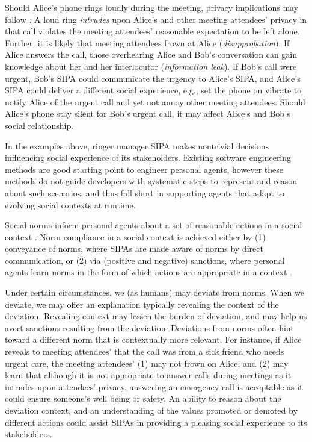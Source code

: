 Should Alice's phone rings loudly during the meeting, privacy
implications may follow
\citep{Murukannaiah-IC16-Engineering,solove-2006-taxonomy}. A loud ring
\emph{intrudes} upon Alice's and other meeting attendees' privacy in
that call violates the meeting attendees' reasonable expectation to be
left alone. Further, it is likely that meeting attendees frown at Alice
(\emph{disapprobation}). If Alice answers the call, those overhearing
Alice and Bob's conversation can gain knowledge about her and her
interlocutor (\emph{information leak}). If Bob's call were urgent, Bob's
SIPA could communicate the urgency to Alice's SIPA, and Alice's SIPA
could deliver a different social experience, e.g., set the phone on vibrate
to notify Alice of the urgent call and yet not annoy other meeting attendees.
Should Alice's phone stay silent for Bob's urgent call, it may affect
Alice's and Bob's social relationship.

In the examples above, ringer manager SIPA makes nontrivial decisions
influencing social experience of its stakeholders. Existing software engineering methods
\citep{Bresciani-JAAMAS04-Tropos,Winikoff-2004-DIA,Murukannaiah-AAMAS14-Xipho}
are good starting point to engineer personal agents, however these
methods do not guide developers with systematic steps to represent and
reason about such scenarios, and thus fall short in supporting agents
that adapt to evolving social contexts at runtime.

Social norms inform personal agents about a set of reasonable actions in a social
context \citep{vanRiemsdijk-AAMAS15-SociallyAdaptive}. Norm compliance in
a social context is achieved either by (1) conveyance of norms, where
SIPAs are made aware of norms by direct communication, or (2) via
(positive and negative) sanctions, where personal agents learn norms in the form
of which actions are appropriate in a context
\citep{Andrighetto-2013-PunishVoice}. 

Under certain circumstances, we (as humans) may deviate from norms. When
we deviate, we may offer an explanation typically revealing the context
of the deviation. Revealing context may lessen the burden of deviation,
and may help us avert sanctions resulting from the deviation. Deviations
from norms often hint toward a different norm that is contextually
more relevant. For instance, if Alice reveals to meeting attendees' that the
call was from a sick friend who needs urgent care, the meeting
attendees' (1) may not frown on Alice, and (2) may learn that although
it is not appropriate to answer calls during meetings as it intrudes
upon attendees' privacy, answering an emergency call is acceptable as it
could ensure someone's well being or safety. An ability to reason about
the deviation context, and an understanding of the values promoted or demoted by different
actions could assist SIPAs in providing a pleasing social experience to
its stakeholders.

